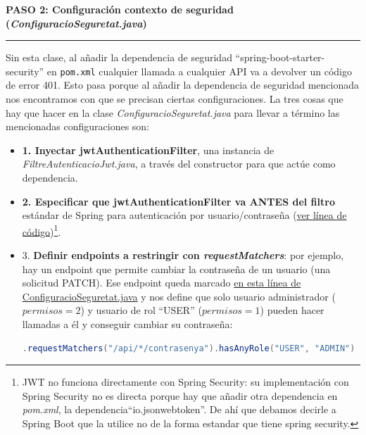 \documentclass[a4paper,12pt]{report}
\begin{document}
		\noindent \textbf{PASO 2: Configuración contexto de seguridad (\textit{ConfiguracioSeguretat.java})}
		\hrule
		\vspace{1em}
		
		Sin esta clase, al añadir la dependencia de seguridad ``spring-boot-starter-security'' en \texttt{pom.xml} cualquier llamada a cualquier API va a devolver un código de error 401. Esto pasa porque al añadir la dependencia de seguridad mencionada nos encontramos con que se precisan ciertas configuraciones. La tres cosas que hay que hacer en la clase \textit{ConfiguracioSeguretat.java} para llevar a término las mencionadas configuraciones son:
		
		
		\begin{itemize}
		\setlength{\itemsep}{-.3em}
		 
		 
		\item \textbf{1. Inyectar jwtAuthenticationFilter}, una instancia de \textit{FiltreAutenticacioJwt.java}, a través del constructor para que actúe como dependencia.
		 
		\item \textbf{2. Especificar que jwtAuthenticationFilter va ANTES del filtro} estándar de Spring para autenticación por usuario/contraseña (\href{https://github.com/blackcub3s/mercApp/blob/db26ff53664be55223c793cf9b52ade87688be45/APP%20WEB/__springboot__produccio__/app/src/main/java/miApp/app/seguretat/ConfiguracioSeguretat.java#L41}{ver línea de código})\footnote{JWT no funciona directamente con Spring Security: su implementación con Spring Security no es directa porque hay que añadir otra dependencia en \textit{pom.xml}, la dependencia``io.jsonwebtoken''. De ahí que debamos decirle a Spring Boot que la utilice no de la forma estandar que tiene spring security.}. 
		
		\item 3. \textbf{Definir endpoints a restringir con \textit{requestMatchers}}: por ejemplo, hay un endpoint que permite cambiar la contraseña de un usuario (una solicitud PATCH). Ese endpoint queda marcado  \href{https://github.com/blackcub3s/mercApp/blob/db26ff53664be55223c793cf9b52ade87688be45/APP%20WEB/__springboot__produccio__/app/src/main/java/miApp/app/seguretat/ConfiguracioSeguretat.java#L34}{en esta línea de ConfiguracioSeguretat.java} y nos define que solo usuario administrador ($permisos = 2$) y usuario de rol ``USER'' ($permisos = 1$) pueden hacer llamadas a él y conseguir cambiar su contraseña:
		
\begin{lstlisting}[language=java, basicstyle=\ttfamily\footnotesize, keywordstyle=\color{magenta}]
.requestMatchers("/api/*/contrasenya").hasAnyRole("USER", "ADMIN")
\end{lstlisting}


		\end{itemize}
\end{document}
